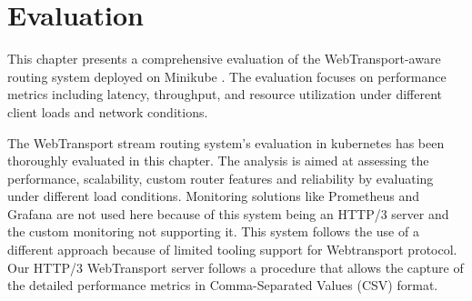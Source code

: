 




\chapter{Evaluation}
\label{chap:Evaluation}

This chapter presents a comprehensive evaluation of the WebTransport-aware routing system deployed on Minikube \cite{minikube-docs}. The evaluation focuses on performance metrics including latency, throughput, and resource utilization under different client loads and network conditions.

The WebTransport stream routing system's evaluation in kubernetes has been thoroughly evaluated in this chapter. The analysis is aimed at assessing the performance, scalability, custom router features and reliability by evaluating under different load conditions.  Monitoring solutions like Prometheus and Grafana are not used here because of this system being an HTTP/3 server and the custom monitoring not supporting it. This system follows the use of a different approach because of limited tooling support for Webtransport protocol. Our HTTP/3 WebTransport server follows a procedure that allows the capture of the detailed performance metrics in Comma-Separated Values (CSV) format.

